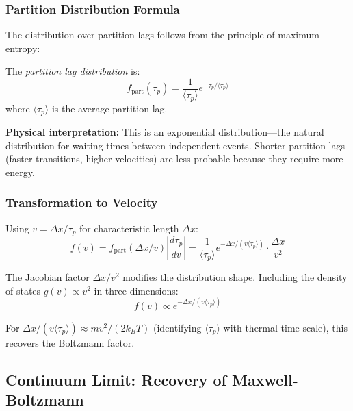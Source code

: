 \subsubsection{Partition Distribution Formula}

The distribution over partition lags follows from the principle of maximum entropy:

\begin{definition}
The \textit{partition lag distribution} is:
\begin{equation}
\boxed{f_{\text{part}}(\tau_p) = \frac{1}{\langle\tau_p\rangle} e^{-\tau_p/\langle\tau_p\rangle}}
\label{eq:partition_distribution}
\end{equation}
where $\langle\tau_p\rangle$ is the average partition lag.
\end{definition}

\textbf{Physical interpretation:} This is an exponential distribution---the natural distribution for waiting times between independent events. Shorter partition lags (faster transitions, higher velocities) are less probable because they require more energy.

\subsubsection{Transformation to Velocity}

Using $v = \Delta x/\tau_p$ for characteristic length $\Delta x$:
\begin{equation}
f(v) = f_{\text{part}}(\Delta x/v) \left|\frac{d\tau_p}{dv}\right| = \frac{1}{\langle\tau_p\rangle} e^{-\Delta x/(v\langle\tau_p\rangle)} \cdot \frac{\Delta x}{v^2}
\end{equation}

The Jacobian factor $\Delta x/v^2$ modifies the distribution shape. Including the density of states $g(v) \propto v^2$ in three dimensions:
\begin{equation}
f(v) \propto e^{-\Delta x/(v\langle\tau_p\rangle)}
\end{equation}

For $\Delta x/(v\langle\tau_p\rangle) \approx mv^2/(2k_B T)$ (identifying $\langle\tau_p\rangle$ with thermal time scale), this recovers the Boltzmann factor.

\subsection{Continuum Limit: Recovery of Maxwell-Boltzmann}

